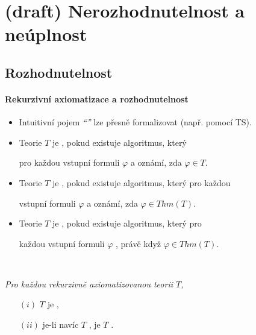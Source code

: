 \chapter{(draft) Nerozhodnutelnost a neúplnost}\todo




\section{Rozhodnutelnost}\todo

\subsubsection*{Rekurzivní axiomatizace a rozhodnutelnost}
    \begin{itemize}
    \item Intuitivní pojem \emph{``''} lze přesně formalizovat (např. pomocí TS).
    \smallskip
    
    \item Teorie $T$ je , pokud existuje algoritmus, který
    \smallskip
    
    pro každou vstupní formuli $\varphi$  a oznámí, zda $\varphi \in T$.
    \smallskip
    
    \item Teorie $T$ je , pokud existuje algoritmus, který pro každou
    \smallskip
    
    vstupní formuli $\varphi$  a oznámí, zda $\varphi \in Thm(T)$.
    \smallskip
    
    \item Teorie $T$ je , pokud existuje algoritmus, který pro
    \smallskip
    
    každou vstupní formuli $\varphi$ , právě když $\varphi \in Thm(T)$.
    \end{itemize}
    \smallskip
    
    {\bf {}}\ \ {\it Pro každou rekurzivně axiomatizovanou teorii $T$,

    \begin{enumerate}
    \item [$(i)$] $T$ je ,
    \smallskip
    
    \item [$(ii)$] je-li navíc $T$ , je $T$ .
    \end{enumerate}}
    \smallskip
    
